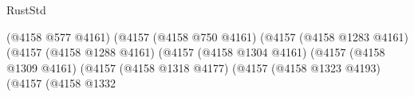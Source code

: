 \begin{lexlean}{RustStd}
\begin{coremodule}
                                                                            (@4158 @577 @4161)
                                                                            (@4157
                                                                              (@4158 @750 @4161)
                                                                              (@4157
                                                                                (@4158 @1283 @4161)
                                                                                (@4157
                                                                                  (@4158
                                                                                    @1288
                                                                                    @4161)
                                                                                  (@4157
                                                                                    (@4158
                                                                                      @1304
                                                                                      @4161)
                                                                                    (@4157
                                                                                      (@4158
                                                                                        @1309
                                                                                        @4161)
                                                                                      (@4157
                                                                                        (@4158
                                                                                          @1318
                                                                                          @4177)
                                                                                        (@4157
                                                                                          (@4158
                                                                                            @1323
                                                                                            @4193)
                                                                                          (@4157
                                                                                            (@4158
                                                                                              @1332

\end{coremodule}
\end{lexlean}
